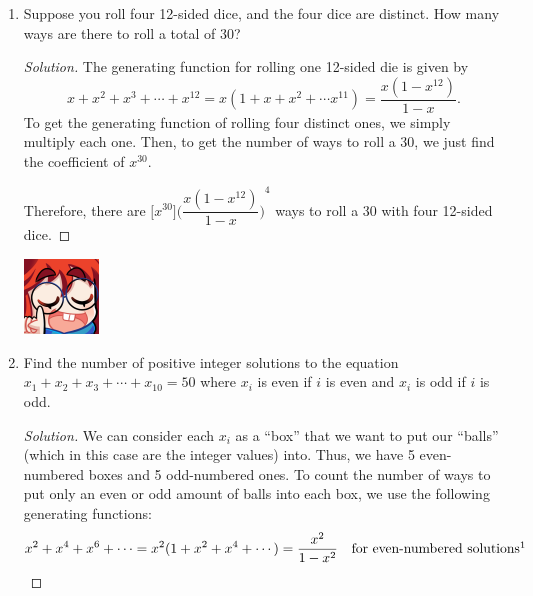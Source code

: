 \documentclass{article}
\newenvironment{solution}
  {\renewcommand\qedsymbol{$\blacksquare$}\begin{proof}[Solution]}
  {\end{proof}}
\begin{document}
\begin{enumerate}
    \item Suppose you roll four 12-sided dice, and the four dice are distinct. How many ways are
    there to roll a total of 30?\begin{solution} 
        The generating function for rolling one 12-sided die is given by\[
            x + x^2 + x^3 + \cdots + x^{12} = x(1+x+x^2 +\cdots x^{11}) = \frac{x(1-x^{12})}{1-x}.    
        \] To get the generating function of rolling four distinct ones, we simply multiply each one. Then, to 
        get the number of ways to roll a 30, we just find the coefficient of $x^{30}$.\par 
        Therefore, there are $\big[x^{30}\big] {\bigg(\dfrac{x(1-x^{12})}{1-x} \bigg)}^4$ ways to roll a 30 with four 12-sided dice. 
    \end{solution}
    \begin{minipage}[t]{.14\textwidth}
        \vspace{0pt}
        \includegraphics[width=2cm]{nerd_maddy.png} 
    \end{minipage}%
    \item Find the number of positive integer solutions to the equation $x_1 + x_2 + x_3 + \cdots + x_{10} = 50$ where $x_i$ is even if $i$ is even and $x_i$ is odd if $i$ is odd.\begin{solution} 
        We can consider each $x_i$ as a ``box'' that we want to put our ``balls'' (which in this case are the integer values) into. Thus, we have 5 even-numbered boxes and 5 odd-numbered ones. To count the
        number of ways to put only an even or odd amount of balls into each box, we use the following generating functions:\begin{align*} 
            x^2 + x^4 + x^6 + \cdots = x^2(1 + x^2 + x^4 + \cdots) &= \frac{x^2}{1-x^2} &\text{for even-numbered solutions}\footnotemark \\

\end{align*}
\end{solution}
\end{enumerate}
\end{document}
